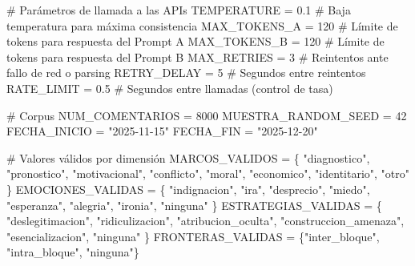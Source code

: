 \documentclass[
  letterpaper,
  numbers=noendperiod,
  fontsize=11pt,
  DIV=12,
  titlepage=false]{scrreprt}
\newenvironment{Shaded}{\begin{snugshade}}{\end{snugshade}}
\newcommand{\CommentTok}[1]{\textcolor[rgb]{0.37,0.37,0.37}{#1}}
\newcommand{\DecValTok}[1]{\textcolor[rgb]{0.68,0.00,0.00}{#1}}
\newcommand{\FloatTok}[1]{\textcolor[rgb]{0.68,0.00,0.00}{#1}}
\newcommand{\NormalTok}[1]{\textcolor[rgb]{0.00,0.23,0.31}{#1}}
\newcommand{\OperatorTok}[1]{\textcolor[rgb]{0.37,0.37,0.37}{#1}}
\newcommand{\StringTok}[1]{\textcolor[rgb]{0.13,0.47,0.30}{#1}}
\begin{document}
\begin{Shaded}
\begin{Highlighting}[]
\CommentTok{\# Parámetros de llamada a las APIs}
\NormalTok{TEMPERATURE   }\OperatorTok{=} \FloatTok{0.1}   \CommentTok{\# Baja temperatura para máxima consistencia}
\NormalTok{MAX\_TOKENS\_A  }\OperatorTok{=} \DecValTok{120}   \CommentTok{\# Límite de tokens para respuesta del Prompt A}
\NormalTok{MAX\_TOKENS\_B  }\OperatorTok{=} \DecValTok{120}   \CommentTok{\# Límite de tokens para respuesta del Prompt B}
\NormalTok{MAX\_RETRIES   }\OperatorTok{=} \DecValTok{3}     \CommentTok{\# Reintentos ante fallo de red o parsing}
\NormalTok{RETRY\_DELAY   }\OperatorTok{=} \DecValTok{5}     \CommentTok{\# Segundos entre reintentos}
\NormalTok{RATE\_LIMIT    }\OperatorTok{=} \FloatTok{0.5}   \CommentTok{\# Segundos entre llamadas (control de tasa)}

\CommentTok{\# Corpus}
\NormalTok{NUM\_COMENTARIOS }\OperatorTok{=} \DecValTok{8000}
\NormalTok{MUESTRA\_RANDOM\_SEED }\OperatorTok{=} \DecValTok{42}
\NormalTok{FECHA\_INICIO }\OperatorTok{=} \StringTok{"2025{-}11{-}15"}
\NormalTok{FECHA\_FIN    }\OperatorTok{=} \StringTok{"2025{-}12{-}20"}

\CommentTok{\# Valores válidos por dimensión}
\NormalTok{MARCOS\_VALIDOS }\OperatorTok{=}\NormalTok{ \{}
    \StringTok{"diagnostico"}\NormalTok{, }\StringTok{"pronostico"}\NormalTok{, }\StringTok{"motivacional"}\NormalTok{, }\StringTok{"conflicto"}\NormalTok{,}
    \StringTok{"moral"}\NormalTok{, }\StringTok{"economico"}\NormalTok{, }\StringTok{"identitario"}\NormalTok{, }\StringTok{"otro"}
\NormalTok{\}}
\NormalTok{EMOCIONES\_VALIDAS }\OperatorTok{=}\NormalTok{ \{}
    \StringTok{"indignacion"}\NormalTok{, }\StringTok{"ira"}\NormalTok{, }\StringTok{"desprecio"}\NormalTok{, }\StringTok{"miedo"}\NormalTok{,}
    \StringTok{"esperanza"}\NormalTok{, }\StringTok{"alegria"}\NormalTok{, }\StringTok{"ironia"}\NormalTok{, }\StringTok{"ninguna"}
\NormalTok{\}}
\NormalTok{ESTRATEGIAS\_VALIDAS }\OperatorTok{=}\NormalTok{ \{}
    \StringTok{"deslegitimacion"}\NormalTok{, }\StringTok{"ridiculizacion"}\NormalTok{, }\StringTok{"atribucion\_oculta"}\NormalTok{,}
    \StringTok{"construccion\_amenaza"}\NormalTok{, }\StringTok{"esencializacion"}\NormalTok{, }\StringTok{"ninguna"}
\NormalTok{\}}
\NormalTok{FRONTERAS\_VALIDAS }\OperatorTok{=}\NormalTok{ \{}\StringTok{"inter\_bloque"}\NormalTok{, }\StringTok{"intra\_bloque"}\NormalTok{, }\StringTok{"ninguna"}\NormalTok{\}}
\end{Highlighting}
\end{Shaded}
\end{document}
